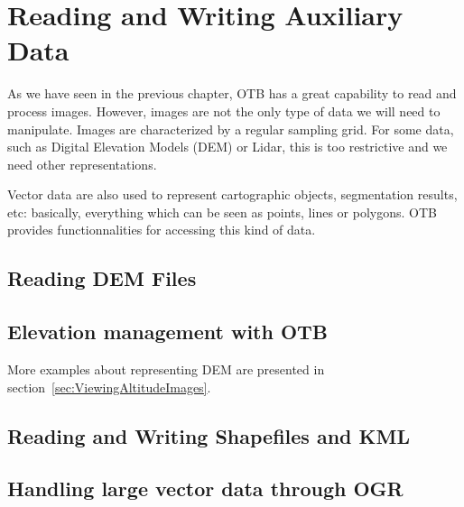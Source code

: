 \chapter{Reading and Writing Auxiliary Data}
\label{sec:ReadingAuxData}

As we have seen in the previous chapter, OTB has a great capability to
read and process images. However, images are not the only type of data
we will need to manipulate. Images are characterized by a regular
sampling grid. For some data, such as Digital Elevation Models (DEM)
or Lidar, this is too restrictive and we need other representations.

Vector data are also used to represent cartographic objects,
segmentation results, etc: basically, everything which can be seen as
points, lines or polygons. OTB provides functionnalities for accessing
this kind of data.

\section{Reading DEM Files}
\label{sec:ReadDEM}


\section{Elevation management with OTB}
\ifitkFullVersion
\label{sec:DEMHandler}
\fi


More examples about representing DEM are presented in section~\ref{sec:ViewingAltitudeImages}.

\section{Reading and Writing Shapefiles and KML}
\label{sec:ReadVectorData}


\section{Handling large vector data through OGR}
\label{sec:OGRWrappers}


% 
